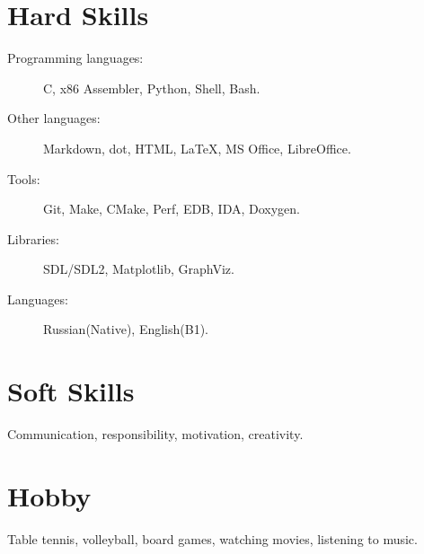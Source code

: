 \documentclass[margin,line]{resume}
\begin{document}
\begin{resume}
       
    \section{\mysidestyle Hard Skills}
    \begin{description}
		\item[Programming languages:] C, x86 Assembler, Python, Shell, Bash.
            \item[Other languages:] Markdown, dot, HTML, \LaTeX, MS Office, LibreOffice. 
		\item[Tools:] Git, Make, CMake, Perf, EDB, IDA, Doxygen.
            \item[Libraries:] SDL/SDL2, Matplotlib, GraphViz.
            \item[Languages:] Russian(Native), English(B1).
    \end{description}

    \vspace{1pt}

    \section{\mysidestyle Soft Skills}
    Communication, responsibility, motivation, creativity.

    \section{\mysidestyle Hobby}
    Table tennis, volleyball, board games, watching movies, listening to music.
     
\end{resume}   
\end{document}
